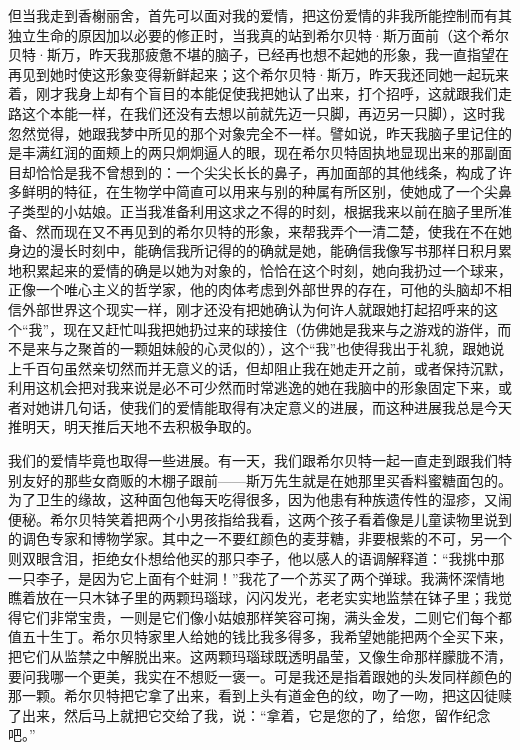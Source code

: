 \par 但当我走到香榭丽舍，首先可以面对我的爱情，把这份爱情的非我所能控制而有其独立生命的原因加以必要的修正时，当我真的站到希尔贝特·斯万面前（这个希尔贝特·斯万，昨天我那疲惫不堪的脑子，已经再也想不起她的形象，我一直指望在再见到她时使这形象变得新鲜起来；这个希尔贝特·斯万，昨天我还同她一起玩来着，刚才我身上却有个盲目的本能促使我把她认了出来，打个招呼，这就跟我们走路这个本能一样，在我们还没有去想以前就先迈一只脚，再迈另一只脚），这时我忽然觉得，她跟我梦中所见的那个对象完全不一样。譬如说，昨天我脑子里记住的是丰满红润的面颊上的两只炯炯逼人的眼，现在希尔贝特固执地显现出来的那副面目却恰恰是我不曾想到的：一个尖尖长长的鼻子，再加面部的其他线条，构成了许多鲜明的特征，在生物学中简直可以用来与别的种属有所区别，使她成了一个尖鼻子类型的小姑娘。正当我准备利用这求之不得的时刻，根据我来以前在脑子里所准备、然而现在又不再见到的希尔贝特的形象，来帮我弄个一清二楚，使我在不在她身边的漫长时刻中，能确信我所记得的的确就是她，能确信我像写书那样日积月累地积累起来的爱情的确是以她为对象的，恰恰在这个时刻，她向我扔过一个球来，正像一个唯心主义的哲学家，他的肉体考虑到外部世界的存在，可他的头脑却不相信外部世界这个现实一样，刚才还没有把她确认为何许人就跟她打起招呼来的这个“我”，现在又赶忙叫我把她扔过来的球接住（仿佛她是我来与之游戏的游伴，而不是来与之聚首的一颗姐妹般的心灵似的），这个“我”也使得我出于礼貌，跟她说上千百句虽然亲切然而并无意义的话，但却阻止我在她走开之前，或者保持沉默，利用这机会把对我来说是必不可少然而时常逃逸的她在我脑中的形象固定下来，或者对她讲几句话，使我们的爱情能取得有决定意义的进展，而这种进展我总是今天推明天，明天推后天地不去积极争取的。
\par 我们的爱情毕竟也取得一些进展。有一天，我们跟希尔贝特一起一直走到跟我们特别友好的那些女商贩的木棚子跟前——斯万先生就是在她那里买香料蜜糖面包的。为了卫生的缘故，这种面包他每天吃得很多，因为他患有种族遗传性的湿疹，又闹便秘。希尔贝特笑着把两个小男孩指给我看，这两个孩子看着像是儿童读物里说到的调色专家和博物学家。其中之一不要红颜色的麦芽糖，非要根紫的不可，另一个则双眼含泪，拒绝女仆想给他买的那只李子，他以感人的语调解释道：“我挑中那一只李子，是因为它上面有个蛀洞！”我花了一个苏买了两个弹球。我满怀深情地瞧着放在一只木钵子里的两颗玛瑙球，闪闪发光，老老实实地监禁在钵子里；我觉得它们非常宝贵，一则是它们像小姑娘那样笑容可掬，满头金发，二则它们每个都值五十生丁。希尔贝特家里人给她的钱比我多得多，我希望她能把两个全买下来，把它们从监禁之中解脱出来。这两颗玛瑙球既透明晶莹，又像生命那样朦胧不清，要问我哪一个更美，我实在不想贬一褒一。可是我还是指着跟她的头发同样颜色的那一颗。希尔贝特把它拿了出来，看到上头有道金色的纹，吻了一吻，把这囚徒赎了出来，然后马上就把它交给了我，说：“拿着，它是您的了，给您，留作纪念吧。”
